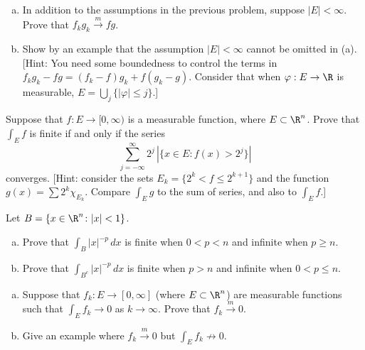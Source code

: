 \begin{hw} \label{hw:24} \hfill
\begin{enumerate}[(a)]
\item In addition to the assumptions in the previous problem, suppose $|E| < \infty$. Prove that $f_k g_k \xrightarrow{m} f g$.
\item Show by an example that the assumption $|E| < \infty$ cannot be omitted in (a). [Hint: You need some boundedness to control the terms in $f_k g_k - fg= (f_k-f)g_k + f (g_k - g)$. Consider that when $\varphi: E \to \R$ is measurable, $E= \bigcup_{j} \{ |\varphi| \leq j \}$.] \\
\end{enumerate}
\end{hw}






\begin{hw} \label{hw:25}
Suppose that $f: E \to [0, \infty)$ is a measurable function, where $E \subset \R^n$. Prove that $\int_E f$ is finite if and only if the series 
        \[
        \sum_{j = -\infty}^\infty 2^j \, | \{x \in E \colon f(x)>2^j \}|
        \]
converges. [Hint: consider the sets $E_k = \{2^k<f\leq 2^{k+1}\}$ and the function $g(x)= \sum 2^k \chi_{E_k}$. Compare $\int_E g$ to the sum of series, and also to $\int_E f$.] \\
\end{hw}


\begin{hw} \label{hw:26}
Let $B=\{ x \in \R^n \colon |x|<1 \}$. \hfill
\begin{enumerate}[(a)]
\item Prove that $\int_{B} |x|^{-p} \,dx$ is finite when $0<p<n$ and infinite when $p \geq n$. 
\item Prove that $\int_{B^c} |x|^{-p} \,dx$ is finite when $p>n$ and infinite when $0 < p \leq n$. \\
\end{enumerate}
\end{hw}


\begin{hw} \label{hw:27} \hfill
\begin{enumerate}[(a)]
\item Suppose that $f_k: E \to [0, \infty]$ (where $E \subset \R^n$) are measurable functions such that $\int_E f_k \to 0$ as $k \to \infty$. Prove that $f_k \xrightarrow{m} 0$.  
\item Give an example where $f_k \xrightarrow{m} 0$ but  $\int_E f_k \not\to 0$. \\
\end{enumerate}
\end{hw}


